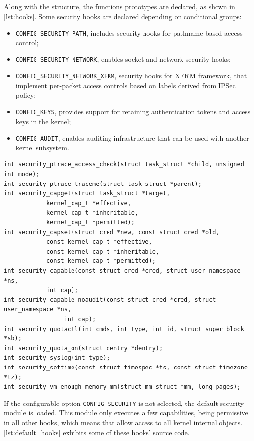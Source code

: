 \noindent
Along with the structure, the functions prototypes are declared, as shown in \autoref{lst:hooks}. Some security hooks are declared depending on conditional groups:

\begin{itemize}
 \item \texttt{CONFIG\_SECURITY\_PATH}, includes security hooks for pathname based access control;
 \item \texttt{CONFIG\_SECURITY\_NETWORK}, enables socket and network security hooks;
 \item \texttt{CONFIG\_SECURITY\_NETWORK\_XFRM}, security hooks for XFRM framework, that implement per-packet access controls based on labels derived from IPSec policy;
\item \texttt{CONFIG\_KEYS}, provides support for retaining authentication tokens and access keys in the kernel;
\item \texttt{CONFIG\_AUDIT}, enables auditing infrastructure that can be used with another kernel subsystem.
\end{itemize}

\begin{lstlisting}[frame=none, numbers=none, caption=Security functions declaration (Linux kernel v3.11), label=lst:hooks]
int security_ptrace_access_check(struct task_struct *child, unsigned int mode);
int security_ptrace_traceme(struct task_struct *parent);
int security_capget(struct task_struct *target,
		    kernel_cap_t *effective,
		    kernel_cap_t *inheritable,
		    kernel_cap_t *permitted);
int security_capset(struct cred *new, const struct cred *old,
		    const kernel_cap_t *effective,
		    const kernel_cap_t *inheritable,
		    const kernel_cap_t *permitted);
int security_capable(const struct cred *cred, struct user_namespace *ns,
			int cap);
int security_capable_noaudit(const struct cred *cred, struct user_namespace *ns,
			     int cap);
int security_quotactl(int cmds, int type, int id, struct super_block *sb);
int security_quota_on(struct dentry *dentry);
int security_syslog(int type);
int security_settime(const struct timespec *ts, const struct timezone *tz);
int security_vm_enough_memory_mm(struct mm_struct *mm, long pages);
\end{lstlisting}

\noindent
If the configurable option \texttt{CONFIG\_SECURITY} is not selected, the default security module is loaded. This module only executes a few capabilities, being permissive in all other hooks, which means that allow access to all kernel internal objects. \autoref{lst:default_hooks} exhibits some of these hooks' source code.

